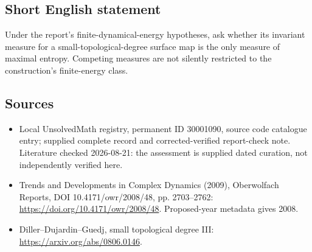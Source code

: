 \documentclass[11pt]{article}
\begin{document}
\subsection{Short English statement}
Under the report's finite-dynamical-energy hypotheses, ask whether its invariant measure for a small-topological-degree surface map is the only measure of maximal entropy. Competing measures are not silently restricted to the construction's finite-energy class.
\subsection{Sources}
\begin{itemize}
\item Local UnsolvedMath registry, permanent ID 30001090, source code catalogue entry; supplied complete record and corrected-verified report-check note. Literature checked 2026-08-21: the assessment is supplied dated curation, not independently verified here.
\item Trends and Developments in Complex Dynamics (2009), Oberwolfach Reports, DOI 10.4171/owr/2008/48, pp. 2703--2762: \url{https://doi.org/10.4171/owr/2008/48}. Proposed-year metadata gives 2008.
\item Diller--Dujardin--Guedj, small topological degree III: \url{https://arxiv.org/abs/0806.0146}.
\end{itemize}
\end{document}
